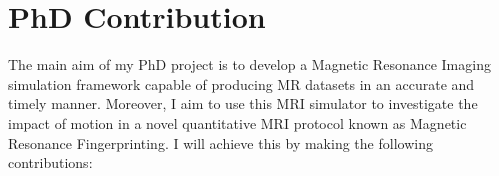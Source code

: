 \section{PhD Contribution}\label{chapterlabel1sec2}

The main aim of my PhD project is to develop a Magnetic Resonance Imaging simulation framework capable of producing MR datasets in an accurate and timely manner.
Moreover, I aim to use this MRI simulator to investigate the impact of motion in a novel quantitative MRI protocol known as Magnetic Resonance Fingerprinting.
I will achieve this by making the following contributions:


